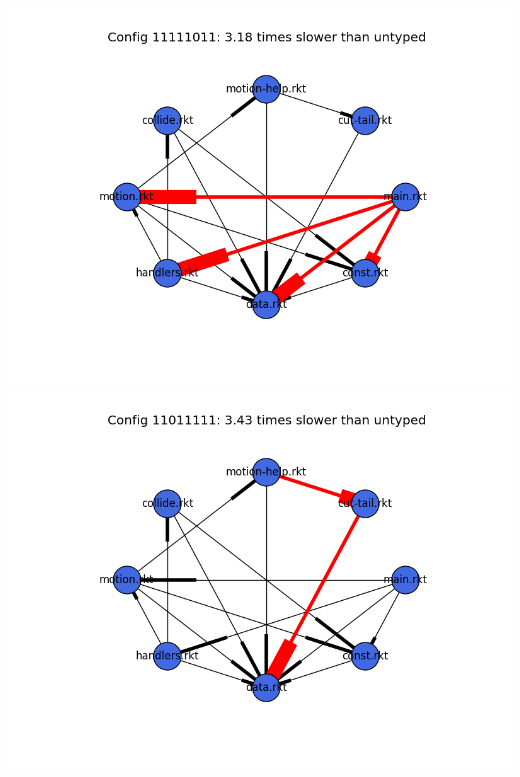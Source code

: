 \documentclass{article}
\begin{document}
\begin{itemize}
\includegraphics[width=\textwidth]{snake-2015-04-10-module-graph-11111011.png}
\includegraphics[width=\textwidth]{snake-2015-04-10-module-graph-11011111.png}
\end{itemize}
\end{document}
